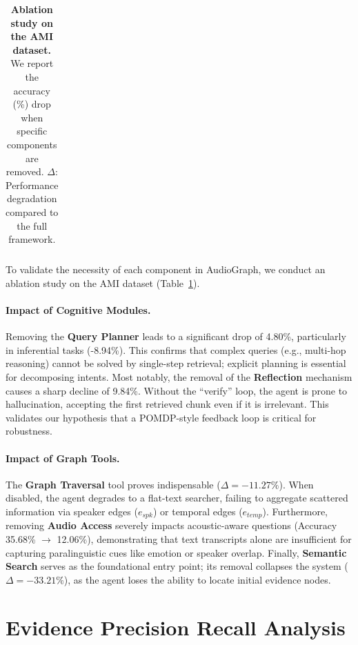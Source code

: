 \documentclass[11pt]{article}
\begin{document}
\begin{table}[h]
{\begin{tabular}{l | c c | c c c c c}
            \bottomrule
        \end{tabular}%
    }
    \caption{\textbf{Ablation study on the AMI dataset.} We report the accuracy (\%) drop when specific components are removed. \textbf{$\Delta$}: Performance degradation compared to the full framework. }
    \label{tab:ablation_detail}
\end{table}
To validate the necessity of each component in AudioGraph, we conduct an ablation study on the AMI dataset (Table~\ref{tab:ablation_detail}). 

\paragraph{Impact of Cognitive Modules.} 
Removing the \textbf{Query Planner} leads to a significant drop of 4.80\%, particularly in inferential tasks (-8.94\%). This confirms that complex queries (e.g., multi-hop reasoning) cannot be solved by single-step retrieval; explicit planning is essential for decomposing intents. 
Most notably, the removal of the \textbf{Reflection} mechanism causes a sharp decline of 9.84\%. Without the ``verify'' loop, the agent is prone to hallucination, accepting the first retrieved chunk even if it is irrelevant. This validates our hypothesis that a POMDP-style feedback loop is critical for robustness.

\paragraph{Impact of Graph Tools.}
The \textbf{Graph Traversal} tool proves indispensable ($\Delta=-11.27\%$). When disabled, the agent degrades to a flat-text searcher, failing to aggregate scattered information via speaker edges ($e_{spk}$) or temporal edges ($e_{temp}$). 
Furthermore, removing \textbf{Audio Access} severely impacts acoustic-aware questions (Accuracy 35.68\% $\to$ 12.06\%), demonstrating that text transcripts alone are insufficient for capturing paralinguistic cues like emotion or speaker overlap. 
Finally, \textbf{Semantic Search} serves as the foundational entry point; its removal collapses the system ($\Delta=-33.21\%$), as the agent loses the ability to locate initial evidence nodes.

\section{Evidence Precision Recall Analysis}
\end{document}
